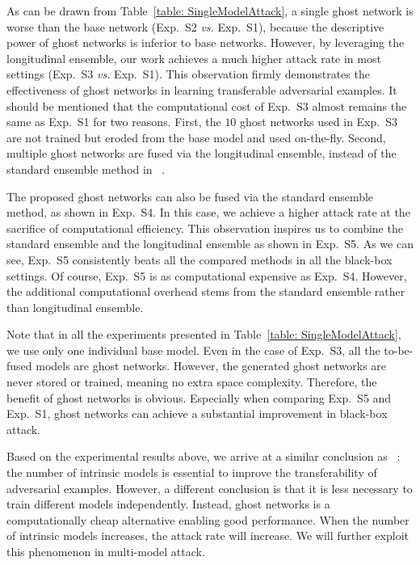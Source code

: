 \documentclass[letterpaper]{article} %
\newcommand{\citet}[1]{\citeauthor{#1} \shortcite{#1}}
\begin{document}
As can be drawn from Table~\ref{table: SingleModelAttack}, a single ghost network is worse than the base network (Exp.~S2 \emph{vs.} Exp.~S1), because the descriptive power of ghost networks is inferior to base networks. However, by leveraging the longitudinal ensemble, our work achieves a much higher attack rate in most settings (Exp.~S3 \emph{vs.} Exp.~S1).
This observation firmly demonstrates the effectiveness of ghost networks in learning transferable adversarial examples. It should be mentioned that the computational cost of Exp.~S3 almost remains the same as Exp.~S1 for two reasons. First, the $10$ ghost networks used in Exp.~S3 are not trained but eroded from the base model and used on-the-fly. Second, multiple ghost networks are fused via the longitudinal ensemble, instead of the standard ensemble method in~\citet{liu2016delving}.

The proposed ghost networks can also be fused via the standard ensemble method, as shown in Exp.~S4. In this case, we achieve a higher attack rate at the sacrifice of computational efficiency. This observation inspires us to combine the standard ensemble and the longitudinal ensemble as shown in Exp.~S5. As we can see, Exp.~S5 consistently beats all the compared methods in all the black-box settings. Of course, Exp.~S5 is as computational expensive as Exp.~S4. However, the additional computational overhead stems from the standard ensemble rather than longitudinal ensemble. 

Note that in all the experiments presented in Table~\ref{table: SingleModelAttack}, we use only one individual base model. Even in the case of Exp.~S3, all the to-be-fused models are ghost networks. However, the generated ghost networks are never stored or trained, meaning no extra space complexity. Therefore, the benefit of ghost networks is obvious. Especially when comparing Exp.~S5 and Exp.~S1, ghost networks can achieve a substantial improvement in black-box attack.

Based on the experimental results above, we arrive at a similar conclusion as~\citet{liu2016delving}: the number of intrinsic models is essential to improve the transferability of adversarial examples. However, a different conclusion is that it is less necessary to train different models independently. Instead, ghost networks is a computationally cheap alternative enabling good performance. When the number of intrinsic models increases, the attack rate will increase. We will further exploit this phenomenon in multi-model attack.
\end{document}
